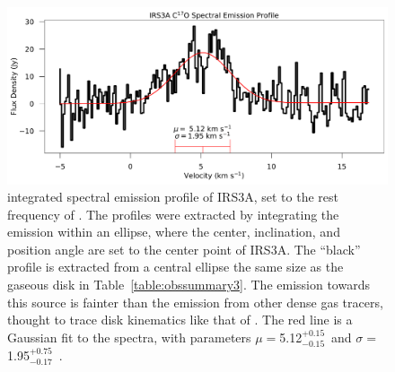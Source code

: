 \begin{figure}[H]
  \begin{center}
   \includegraphics[width=\textwidth]{img/c17o-spectra-irs3a.pdf}
   \end{center}
   \caption{\cso\space integrated spectral emission profile of IRS3A, set to the rest frequency of \cso. The profiles were extracted by integrating the emission within an ellipse, where the center, inclination, and position angle are set to the center point of IRS3A. The ``black'' profile is extracted from a central ellipse the same size as the gaseous disk in Table~\ref{table:obssummary3}. The \cso\space emission towards this source is fainter than the emission from other dense gas tracers, thought to trace disk kinematics like that of \htcn.  The red line is a Gaussian fit to the spectra, with parameters $\mu=$5.12$^{+0.15}_{-0.15}$~\kms\space and $\sigma=$1.95$^{+0.75}_{-0.17}$~\kms.}\label{fig:irs3aspec}
\end{figure}

